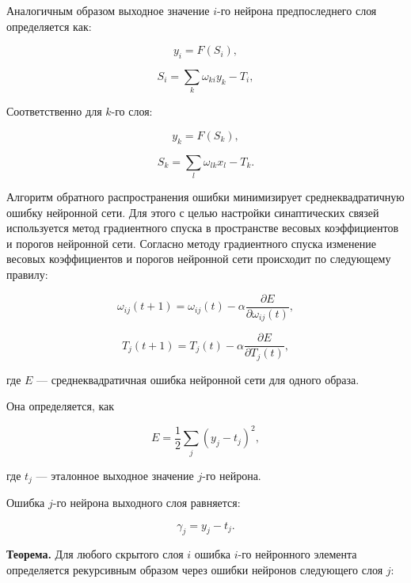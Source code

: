 Аналогичным образом выходное значение $i$-го нейрона предпоследнего слоя определяется как:

\begin{equation}
    y_i = F(S_i),
\end{equation}

\begin{equation}
    S_i = \sum_{k}{\omega_{k i} y_k - T_i},
\end{equation}

Соответственно для $k$-го слоя:

\begin{equation}
    y_k = F(S_k),
\end{equation}

\begin{equation}
    S_k = \sum_{l}{\omega_{l k} x_l - T_k}.
\end{equation}

Алгоритм обратного распространения ошибки минимизирует среднеквадратичную ошибку нейронной сети. Для этого с целью настройки синаптических связей используется метод градиентного спуска в пространстве весовых коэффициентов и порогов нейронной сети. Согласно методу градиентного спуска изменение весовых коэффициентов и порогов нейронной сети происходит по следующему правилу:

\begin{equation}
    \omega_{i j}(t + 1) = \omega_{i j}(t) - \alpha\frac{\partial E}{\partial\omega_{i j}(t)},
\end{equation}

\begin{equation}
    T_j(t + 1) = T_j(t) - \alpha\frac{\partial E}{\partial T_j(t)},
\end{equation}

где $E$ — среднеквадратичная ошибка нейронной сети для одного образа.

Она определяется, как

\begin{equation}
    E = \frac{1}{2} \sum_{j}{(y_j - t_j)^2},
\end{equation}

где $t_j$ — эталонное выходное значение $j$-го нейрона.

Ошибка $j$-го нейрона выходного слоя равняется:

\begin{equation}
    \gamma_j = y_j - t_j.
\end{equation}

\textbf{Теорема.} Для любого скрытого слоя $i$ ошибка $i$-го нейронного элемента определяется рекурсивным образом через ошибки нейронов следующего слоя $j$:


